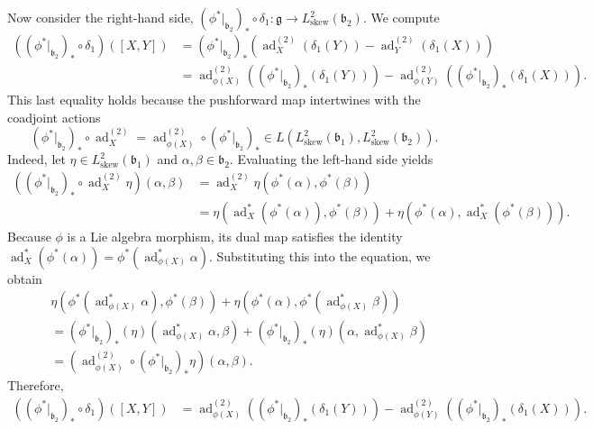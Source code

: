 \documentclass[11pt,reqno]{amsart}
\theoremstyle{definition}
\numberwithin{equation}{section}
\begin{document}
Now consider the right-hand side, $(\phi^*|_{\mathfrak{b}_2})_* \circ \delta_1 : \mathfrak{g} \to L^2_{\text{skew}}(\mathfrak{b}_2)$. We compute
\begin{align*}
((\phi^*|_{\mathfrak{b}_2})_* \circ \delta_1)([X,Y]) &= (\phi^*|_{\mathfrak{b}_2})_*\left(\operatorname{ad}_{X}^{(2)}(\delta_1(Y)) - \operatorname{ad}_{Y}^{(2)}(\delta_1(X))\right)\\
&= \operatorname{ad}_{\phi(X)}^{(2)}\left((\phi^*|_{\mathfrak{b}_2})_*(\delta_1(Y))\right) - \operatorname{ad}_{\phi(Y)}^{(2)}\left((\phi^*|_{\mathfrak{b}_2})_*(\delta_1(X))\right).
\end{align*}
This last equality holds because the pushforward map intertwines with the coadjoint actions
\[
(\phi^*|_{\mathfrak{b}_2})_* \circ \operatorname{ad}_{X}^{(2)} = \operatorname{ad}^{(2)}_{\phi(X)} \circ (\phi^*|_{\mathfrak{b}_2})_* \in L(L^2_{\text{skew}}(\mathfrak{b}_1), L^2_{\text{skew}}(\mathfrak{b}_2)).
\]
Indeed, let $\eta \in L^2_{\text{skew}}(\mathfrak{b}_1)$ and $\alpha, \beta \in \mathfrak{b}_2$. Evaluating the left-hand side yields
\begin{align*}
((\phi^*|_{\mathfrak{b}_2})_* \circ \operatorname{ad}_{X}^{(2)}\eta)(\alpha, \beta) &= \operatorname{ad}_{X}^{(2)} \eta\left(\phi^*(\alpha), \phi^*(\beta)\right)\\
&= \eta\left(\operatorname{ad}^*_{X}(\phi^*(\alpha)), \phi^*(\beta)\right) + \eta\left(\phi^*(\alpha), \operatorname{ad}^*_{X}(\phi^*(\beta))\right).
\end{align*}
Because $\phi$ is a Lie algebra morphism, its dual map satisfies the identity $\operatorname{ad}^*_{X}(\phi^*(\alpha)) = \phi^*(\operatorname{ad}^*_{\phi(X)}\alpha)$. Substituting this into the equation, we obtain
\begin{align*}
&\eta\left(\phi^*(\operatorname{ad}^*_{\phi(X)}\alpha), \phi^*(\beta)\right) + \eta\left(\phi^*(\alpha), \phi^*(\operatorname{ad}^*_{\phi(X)}\beta)\right)\\
&= (\phi^*|_{\mathfrak{b}_2})_*(\eta)(\operatorname{ad}^*_{\phi(X)}\alpha, \beta) + (\phi^*|_{\mathfrak{b}_2})_*(\eta)(\alpha, \operatorname{ad}^*_{\phi(X)}\beta)\\
&= (\operatorname{ad}_{\phi(X)}^{(2)} \circ (\phi^*|_{\mathfrak{b}_2})_*\eta)(\alpha, \beta).
\end{align*}
Therefore,
\begin{align*}
((\phi^*|_{\mathfrak{b}_2})_* \circ \delta_1)([X,Y]) &= \operatorname{ad}_{\phi(X)}^{(2)}\left((\phi^*|_{\mathfrak{b}_2})_*(\delta_1(Y))\right) - \operatorname{ad}_{\phi(Y)}^{(2)}\left((\phi^*|_{\mathfrak{b}_2})_*(\delta_1(X))\right).
\end{align*}
\end{document}
